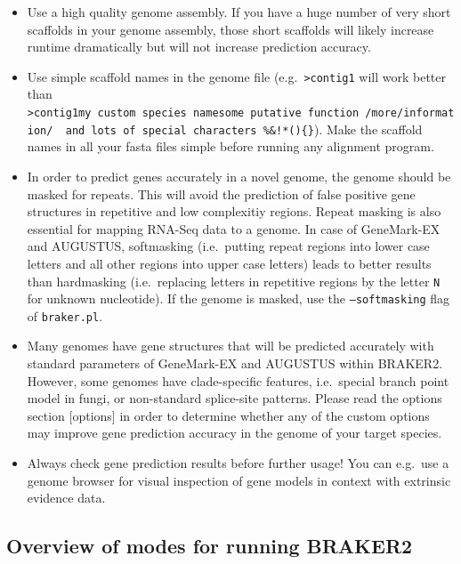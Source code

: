 \documentclass[]{article}
\begin{document}
\begin{itemize}
\item
  Use a high quality genome assembly. If you have a huge number of very
  short scaffolds in your genome assembly, those short scaffolds will
  likely increase runtime dramatically but will not increase prediction
  accuracy.
\item
  Use simple scaffold names in the genome file
  (e.g.~\texttt{\textgreater{}contig1} will work better than
  \texttt{\textgreater{}contig1\textbar{}my\ custom\ species\ name\textbar{}some\ putative\ function\textbar{}\ /more/information/\ \textbar{}\ and\ lots\ of\ special\ characters\ \%\&!*()\{\}}).
  Make the scaffold names in all your fasta files simple before running
  any alignment program.
\item
  In order to predict genes accurately in a novel genome, the genome
  should be masked for repeats. This will avoid the prediction of false
  positive gene structures in repetitive and low complexitiy regions.
  Repeat masking is also essential for mapping RNA-Seq data to a genome.
  In case of GeneMark-EX and AUGUSTUS, softmasking (i.e.~putting repeat
  regions into lower case letters and all other regions into upper case
  letters) leads to better results than hardmasking (i.e.~replacing
  letters in repetitive regions by the letter \texttt{N} for unknown
  nucleotide). If the genome is masked, use the \texttt{–softmasking}
  flag of \texttt{braker.pl}.
\item
  Many genomes have gene structures that will be predicted accurately
  with standard parameters of GeneMark-EX and AUGUSTUS within BRAKER2.
  However, some genomes have clade-specific features, i.e.~special
  branch point model in fungi, or non-standard splice-site patterns.
  Please read the options section {[}options{]} in order to determine
  whether any of the custom options may improve gene prediction accuracy
  in the genome of your target species.
\item
  Always check gene prediction results before further usage! You can
  e.g.~use a genome browser for visual inspection of gene models in
  context with extrinsic evidence data.
\end{itemize}

\hypertarget{overview-of-modes-for-running-braker2}{\subsection{Overview
of modes for running
BRAKER2}\label{overview-of-modes-for-running-braker2}}
\end{document}
